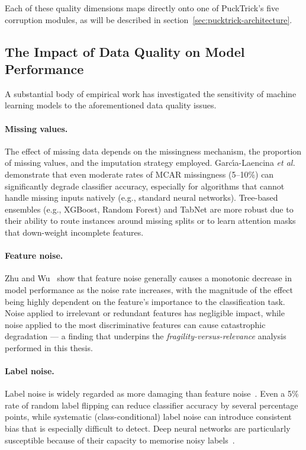 Each of these quality dimensions maps directly onto one of PuckTrick's five
corruption modules, as will be described in section~\ref{sec:pucktrick-architecture}.

\subsection{The Impact of Data Quality on Model Performance}
\label{sec:dq-impact}

A substantial body of empirical work has investigated the sensitivity of machine
learning models to the aforementioned data quality issues.

\paragraph{Missing values.}
The effect of missing data depends on the missingness mechanism, the proportion
of missing values, and the imputation strategy employed.
Garc\'{\i}a-Laencina \emph{et al.}~\cite{garciaLaencina2010pattern} demonstrate
that even moderate rates of MCAR missingness (5--10\%) can significantly degrade
classifier accuracy, especially for algorithms that cannot handle missing inputs
natively (e.g., standard neural networks).  Tree-based ensembles (e.g., XGBoost,
Random Forest) and TabNet are more robust due to their ability to route
instances around missing splits or to learn attention masks that down-weight
incomplete features.

\paragraph{Feature noise.}
Zhu and Wu~\cite{zhu2004class} show that feature noise generally causes a
monotonic decrease in model performance as the noise rate increases, with the
magnitude of the effect being highly dependent on the feature's importance to
the classification task.  Noise applied to irrelevant or redundant features has
negligible impact, while noise applied to the most discriminative features can
cause catastrophic degradation — a finding that underpins the
\emph{fragility-versus-relevance} analysis performed in this thesis.

\paragraph{Label noise.}
Label noise is widely regarded as more damaging than feature
noise~\cite{frenay2014classification, nettleton2010study}.  Even a 5\% rate of
random label flipping can reduce classifier accuracy by several percentage
points, while systematic (class-conditional) label noise can introduce
consistent bias that is especially difficult to detect.  Deep neural networks
are particularly susceptible because of their capacity to memorise noisy
labels~\cite{arpit2017closer, zhang2021understanding}.

